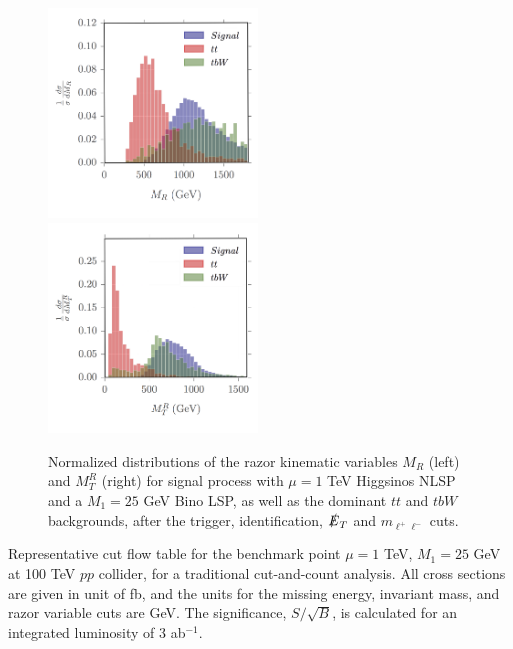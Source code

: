 \documentclass[a4paper,11pt]{article}
\begin{document}
\begin{figure}[h]
\centering
\includegraphics[trim = {0.3cm 0.6cm 0.1cm 0}, clip, width=0.496\textwidth]{images/mR_copy.png}
\includegraphics[trim = {0.3cm 0.6cm 0.1cm 0}, clip, width=0.496\textwidth]{images/mTR_copy.png}
\caption{Normalized distributions of the razor kinematic variables $M_R$
  (left) and $M_T^R$ (right) for signal process with $\mu=1$ TeV Higgsinos NLSP and a $M_1=25$ GeV Bino LSP,  as well as the dominant $tt$ and $tbW$ backgrounds,
  after the trigger, identification,  $\slashed{E}_{T}$ and $m_{\ell^+\ell^-}$ cuts.}
\label{fig:razor_histos}
\end{figure}

\begin{table}[h]
  \centering
  
  \caption{Representative cut flow table for the benchmark point $\mu=1$ TeV,
    $M_1 = 25$ GeV at 100  TeV $pp$ collider, for a traditional cut-and-count analysis. All cross sections
    are given in unit of fb, and the units for the missing energy, invariant
    mass, and razor variable cuts are GeV. The significance, $S/\sqrt{B}$, is
    calculated for an integrated luminosity of 3 ab$^{-1}$.  }
\label{tab:cc_cutflowtable}
\end{table}
\end{document}
